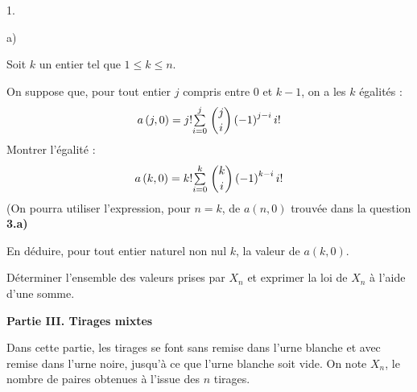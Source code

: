 \documentclass[11pt]{article}%
\begin{document}
\begin{noliste}{1.}
\item 
\begin{noliste}{a)}
 \setlength{\itemsep}{2mm}
\item Soit $k$ un entier tel que $1\leq k\leq n$.

On suppose que, pour tout entier $j$ compris entre $0$ et $k-1$, on a
les $k$
égalités : 
\[
a\left( j,0\right) = j!{\textstyle\sum\limits_{i = 0}^{j}}\hspace{.1cm}\binom{j}{i}\left( -1\right)
^{j-i}i!
\]
Montrer l'égalité : 
\[
a\left( k,0\right) = k!{\textstyle\sum\limits_{i = 0}^{k}}\hspace{.1cm}\binom{k}{i}\left( -1\right)
^{k-i}i!
\]
(On pourra utiliser l'expression, pour $n = k$, de $a\left( n,0\right)
$ trouvée dans la question \textbf{3.a)}

\item En déduire, pour tout entier naturel non nul $k$, la valeur de
$a\left( k,0\right) $.

\item Déterminer l'ensemble des valeurs prises par $X_{n}$ et exprimer
la loi de $X_{n}$ à l'aide d'une somme.
\end{noliste}
\end{noliste}

\textbf{Partie III. Tirages mixtes}

Dans cette partie, les tirages se font sans remise dans l'urne blanche
et
avec remise dans l'urne noire, jusqu'à ce que l'urne blanche soit vide.
On note $X_{n}$, le nombre de paires obtenues à l'issue des $n$
tirages.
\end{document}
